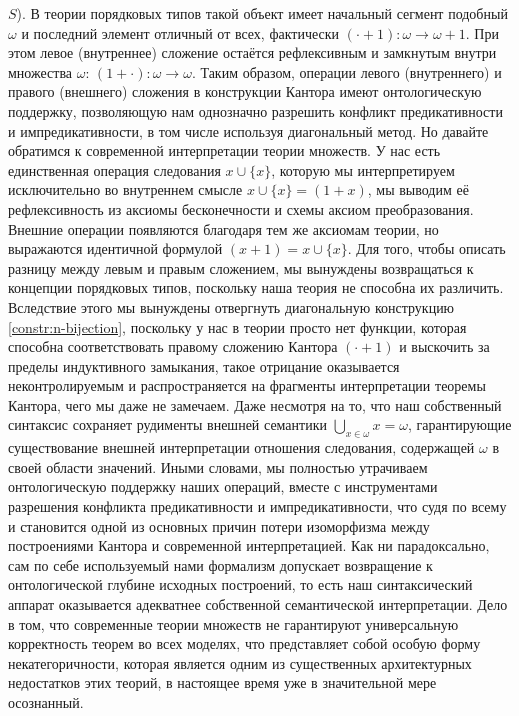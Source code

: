 \documentclass[12pt]{article}
\begin{document}
$S$). В теории порядковых типов такой объект имеет начальный сегмент подобный $\omega$ и последний элемент отличный от всех, фактически $(\cdot + 1) : \omega \to \omega + 1$. При этом левое (внутреннее) сложение остаётся рефлексивным и замкнутым внутри множества $\omega$: $(1 + \cdot) : \omega \to \omega$. Таким образом, операции левого (внутреннего) и правого (внешнего) сложения в конструкции Кантора имеют онтологическую поддержку, позволяющую нам однозначно разрешить конфликт предикативности и импредикативности, в том числе используя диагональный метод. Но давайте обратимся к современной интерпретации теории множеств. У нас есть единственная операция следования $x \cup \{ x \}$, которую мы интерпретируем исключительно во внутреннем смысле $x \cup \{ x \} = (1 + x)$, мы выводим её рефлексивность из аксиомы бесконечности и схемы аксиом преобразования. Внешние операции появляются благодаря тем же аксиомам теории, но выражаются идентичной формулой $(x + 1) = x \cup \{ x \}$. Для того, чтобы описать разницу между левым и правым сложением, мы вынуждены возвращаться к концепции порядковых типов, поскольку наша теория не способна их различить. Вследствие этого мы вынуждены отвергнуть диагональную конструкцию \ref{constr:n-bijection}, поскольку у нас в теории просто нет функции, которая способна соответствовать правому сложению Кантора $(\cdot + 1)$ и выскочить за пределы индуктивного замыкания, такое отрицание оказывается неконтролируемым и распространяется на фрагменты интерпретации теоремы Кантора, чего мы даже не замечаем. Даже несмотря на то, что наш собственный синтаксис сохраняет рудименты внешней семантики $\bigcup\limits_{ x \in \omega } x = \omega$, гарантирующие существование внешней интерпретации отношения следования, содержащей $\omega$ в своей области значений. Иными словами, мы полностью утрачиваем онтологическую поддержку наших операций, вместе с инструментами разрешения конфликта предикативности и импредикативности, что судя по всему и становится одной из основных причин потери изоморфизма между построениями Кантора и современной интерпретацией. Как ни парадоксально, сам по себе используемый нами формализм допускает возвращение к онтологической глубине исходных построений, то есть наш синтаксический аппарат оказывается адекватнее собственной семантической интерпретации. Дело в том, что современные теории множеств не гарантируют универсальную корректность теорем во всех моделях, что представляет собой особую форму некатегоричности, которая является одним из существенных архитектурных недостатков этих теорий, в настоящее время уже в значительной мере осознанный.
\end{document}
